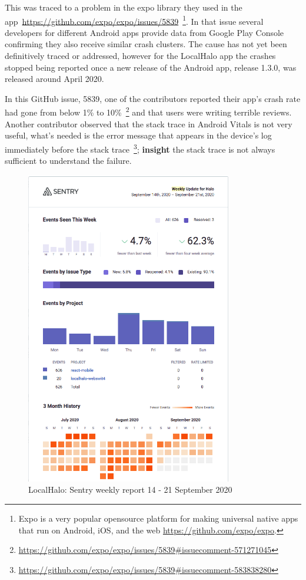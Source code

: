 This was traced to a problem in the expo library they used in the app~\url{https://github.com/expo/expo/issues/5839}~\footnote{Expo is a very popular opensource platform for making universal native apps that run on Android, iOS, and the web \url{https://github.com/expo/expo}.}. In that issue several developers for different Android apps provide data from Google Play Console confirming they also receive similar crash clusters. The cause has not yet been definitively traced or addressed, however for the LocalHalo app the crashes stopped being reported once a new release of the Android app, release 1.3.0, was released around  April 2020.

In this GitHub issue, 5839, one of the contributors reported their app's crash rate had gone from below 1\% to 10\%~\footnote{\url{https://github.com/expo/expo/issues/5839\#issuecomment-571271045}} and that users were writing terrible reviews. Another contributor observed that the stack trace in Android Vitals is not very useful, what's needed is the error message that appears in the device's log immediately before the stack trace~\footnote{\url{https://github.com/expo/expo/issues/5839\#issuecomment-583838280}}; 
\textbf{insight} the stack trace is not always sufficient to understand the failure\label{insight-expo-stack-trace-not-sufficient-to-identify-the-failure}.

\begin{figure}[htbp!]
    \centering
    \includegraphics[width=9cm]{images/localhalo/sentry-weekly-report-21-Sep-2020.png}
    \caption{LocalHalo: Sentry weekly report 14 - 21 September 2020}
    \label{fig:localhalo-sentry-weekly-report-21-sep-2020}
\end{figure}


